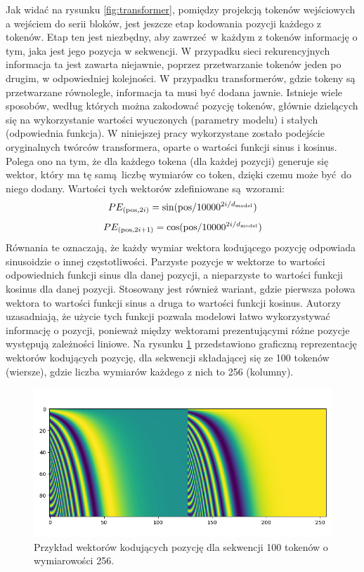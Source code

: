 Jak widać na rysunku \ref{fig:transformer}, pomiędzy projekcją tokenów wejściowych a wejściem do
serii bloków, jest jeszcze etap kodowania pozycji każdego z tokenów. Etap ten jest niezbędny, aby
zawrzeć w każdym z tokenów informację o tym, jaka jest jego pozycja w sekwencji. W przypadku sieci
rekurencyjnych informacja ta jest zawarta niejawnie, poprzez przetwarzanie tokenów jeden po drugim,
w odpowiedniej kolejności. W przypadku transformerów, gdzie tokeny są przetwarzane równolegle,
informacja ta musi być dodana jawnie.  Istnieje wiele sposobów, według których można zakodować
pozycję tokenów, głównie dzielących się na wykorzystanie wartości wyuczonych (parametry modelu) i
stałych (odpowiednia funkcja).  W niniejszej pracy wykorzystane zostało podejście oryginalnych
twórców transformera, oparte o wartości funkcji sinus i kosinus. Polega ono na tym, że dla każdego
tokena (dla każdej pozycji) generuje się wektor, który ma tę samą liczbę wymiarów co token, dzięki
czemu może być do niego dodany. Wartości tych wektorów zdefiniowane są wzorami:
\begin{equation}
    PE_{(\textrm{pos},2i)} = \sin(\textrm{pos}/10000^{2i/d_{\textrm{\tiny model}}})
\end{equation}
\begin{equation}
PE_{(\textrm{pos},2i + 1)} = \cos(\textrm{pos}/10000^{2i/d_{\textrm{\tiny model}}})
\end{equation}
Równania te oznaczają, że każdy wymiar wektora kodującego pozycję odpowiada sinusoidzie o innej
częstotliwości. Parzyste pozycje w wektorze to wartości odpowiednich funkcji sinus dla danej
pozycji, a nieparzyste to wartości funkcji kosinus dla danej pozycji. Stosowany jest również
wariant, gdzie pierwsza połowa wektora to wartości funkcji sinus a druga to wartości funkcji
kosinus. Autorzy uzasadniają, że użycie tych funkcji pozwala modelowi łatwo wykorzystywać informację
o pozycji, ponieważ między wektorami prezentującymi różne pozycje występują zależności liniowe. Na
rysunku \ref{fig:positional_encoding} przedstawiono graficzną reprezentację wektorów kodujących
pozycję, dla sekwencji składającej się ze 100 tokenów (wiersze), gdzie liczba wymiarów każdego z
nich to 256 (kolumny).
\begin{figure}
    \centering
    \includegraphics[width=1.0\textwidth]{./images/positional_encoding.png}
    \caption{Przykład wektorów kodujących pozycję dla sekwencji 100 tokenów o wymiarowości 256.}
    \label{fig:positional_encoding}
\end{figure}

